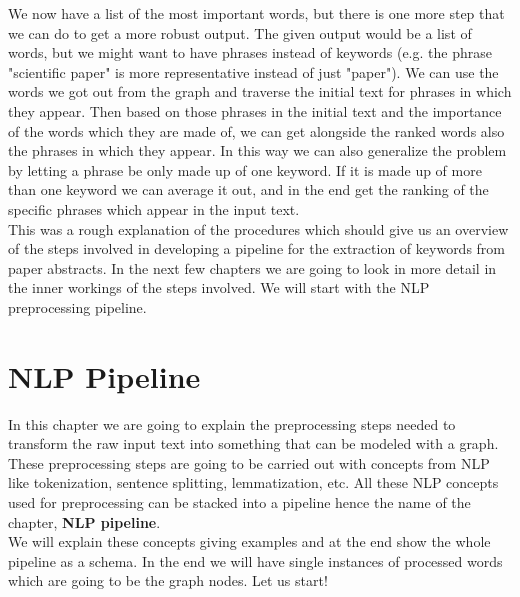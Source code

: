 \documentclass[12pt]{article}
\numberwithin{equation}{section}
\begin{document}
\begin{spacing}{1.5}
	We now have a list of the most important words, but there is one more step that we can do to get a more robust output. The given output would be a list of words, but we might want to have phrases instead of keywords (e.g. the phrase "scientific paper" is more representative instead of just "paper"). We can use the words we got out from the graph and traverse the initial text for phrases in which they appear. Then based on those phrases in the initial text and the importance of the words which they are made of, we can get alongside the ranked words also the phrases in which they appear. In this way we can also generalize the problem by letting a phrase be only made up of one keyword. If it is made up of more than one keyword we can average it out, and in the end get the ranking of the specific phrases which appear in the input text. \\
	This was a rough explanation of the procedures which should give us an overview of the steps involved in developing a pipeline for the extraction of keywords from paper abstracts. In the next few chapters we are going to look in more detail in the inner workings of the steps involved. We will start with the NLP preprocessing pipeline.
	
	
	\newpage
	\section{NLP Pipeline}
	In this chapter we are going to explain the preprocessing steps needed to transform the raw input text into something that can be modeled with a graph. These preprocessing steps are going to be carried out with concepts from NLP like tokenization, sentence splitting, lemmatization, etc. All these NLP concepts used for preprocessing can be stacked into a pipeline hence the name of the chapter, \textbf{NLP pipeline}.\\
	We will explain these concepts giving examples and at the end show the whole pipeline as a schema. In the end we will have single instances of processed words which are going to be the graph nodes. Let us start!
	

\end{spacing}
\end{document}

